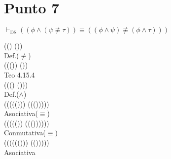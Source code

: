 \documentclass{article}
\begin{document}
\section{Punto 7}
\begin{logicenv}{$\vdash_{\text{DS}} ((\phi \land (\psi \not\equiv \tau)) \equiv ((\phi \land \psi) \not\equiv (\phi \land \tau)))$}
    \begin{derivation}
            ((\phi \land \psi) \not\equiv (\phi \land \tau))\\
        Def.($\not\equiv$)\\
            ((\neg (\phi \land \psi)) \equiv (\phi \land \tau))\\
        Teo 4.15.4\\
            (\neg ((\phi \land \psi) \equiv (\phi \land \psi)))\\
        Def.($\land$)\\
            (\neg ((\phi \equiv (\psi \equiv (\phi \lor \psi))) \equiv (\phi \equiv (\tau \equiv (\phi \lor \tau)))))\\
        Asociativa($\equiv$)\\
            (\neg (\phi \equiv ((\psi \equiv (\phi \lor \psi)) \equiv (\phi \equiv (\tau \equiv (\phi \lor \tau))))))\\
        Conmutativa($\equiv$)\\
            (\neg (\phi \equiv ((\phi \equiv (\tau \equiv (\phi \lor \tau))) \equiv (\psi \equiv (\phi \lor \psi)))))\\
        Asociativa
    \end{derivation}
\end{logicenv}
\end{document}
